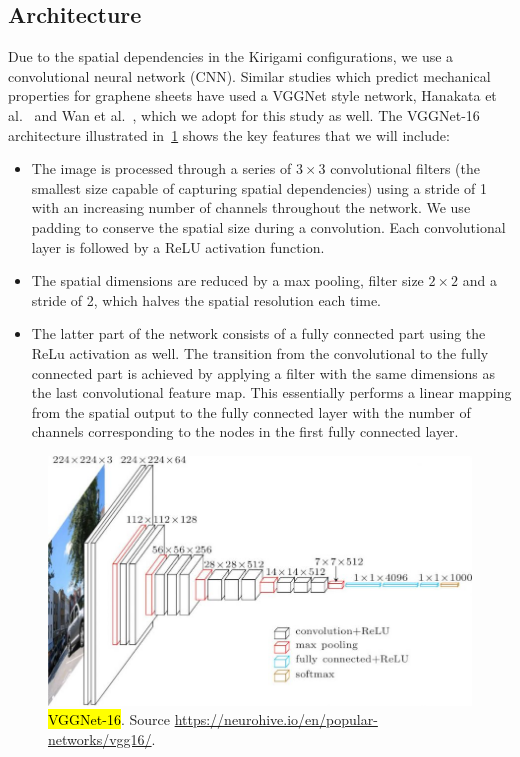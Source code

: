 \subsection{Architecture}
Due to the spatial dependencies in the Kirigami configurations, we use a convolutional neural network (\acrshort{CNN}). Similar studies which predict mechanical properties for graphene sheets have used a VGGNet style network, Hanakata et al.~\cite{PhysRevLett.121.255304, PhysRevResearch.2.042006} and Wan et al.~\cite{graphene/hBN}, which we adopt for this study as well. The VGGNet-16 architecture illustrated in~\cref{fig:VGGNet16} shows the key features that we will include:
\begin{itemize}
  \item The image is processed through a series of $3 \times 3$ convolutional filters (the smallest size capable of capturing spatial dependencies) using a stride of 1 with an increasing number of channels throughout the network. We use padding to conserve the spatial size during a convolution. Each convolutional layer is followed by a ReLU activation function. 
  \item The spatial dimensions are reduced by a max pooling, filter size $2 \times 2$ and a stride of 2, which halves the spatial resolution each time. 
  \item The latter part of the network consists of a fully connected part using the ReLu activation as well. The transition from the convolutional to the fully connected part is achieved by applying a filter with the same dimensions as the last convolutional feature map. This essentially performs a linear mapping from the spatial output to the fully connected layer with the number of channels corresponding to the nodes in the first fully connected layer.
\end{itemize}

\begin{figure}[H]
  \centering
  \includegraphics[width=0.7\linewidth]{figures/ML/VGGNet16.jpg}
  \caption{\hl{VGGNet-16}. Source \url{https://neurohive.io/en/popular-networks/vgg16/}.}
  \label{fig:VGGNet16}
\end{figure}

